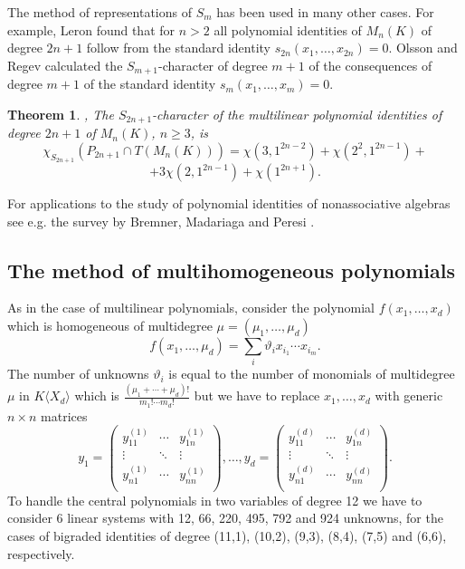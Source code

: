 \documentclass[12pt]{amsart}
\newtheorem{theorem}{Theorem}[section]
\theoremstyle{definition}
\begin{document}
The method of representations of $S_m$ has been used in many other cases.
For example, Leron \cite{Ler} found that for $n>2$ all polynomial identities of $M_n(K)$ of degree $2n+1$
follow from the standard identity $s_{2n}(x_1,\ldots,x_{2n})=0$.
Olsson and Regev \cite{OlsReg} calculated the $S_{m+1}$-character of degree $m+1$
of the consequences of degree $m+1$ of the standard identity $s_m(x_1,\ldots,x_m)=0$.

\begin{theorem}\cite[Theorem 20]{Ler}, \cite[Theorem 1]{OlsReg}\label{Olsson and Regev}
The $S_{2n+1}$-character of the
multilinear polynomial identities of degree $2n+1$ of $M_n(K)$, $n\geq 3$, is
\[
\chi_{S_{2n+1}}(P_{2n+1}\cap T(M_n(K)))=\chi(3,1^{2n-2})+\chi(2^2,1^{2n-1})+
\]
\[
+3\chi(2,1^{2n-1})+\chi(1^{2n+1}).
\]
\end{theorem}

For applications to the study of polynomial identities of nonassociative algebras see e.g.
the survey by Bremner, Madariaga and Peresi \cite{BreMaPe}.

\subsection{The method of multihomogeneous polynomials}
As in the case of multilinear polynomials, consider the polynomial $f(x_1,\ldots,x_d)$ which is homogeneous of multidegree $\mu=(\mu_1,\ldots,\mu_d)$
\[
f(x_1,\ldots,\mu_d)=\sum_i\vartheta_ix_{i_1}\cdots x_{i_m}.
\]
The number of unknowns $\vartheta_i$ is equal to the number of monomials of multidegree $\mu$ in $K\langle X_d\rangle$ which is
$\displaystyle \frac{(\mu_1+\cdots+\mu_d)!}{m_1!\cdots m_d!}$ but we have to replace $x_1,\ldots,x_d$ with generic $n\times n$ matrices
\[
y_1=\left(\begin{matrix}y^{(1)}_{11}&\cdots&y^{(1)}_{1n}\\
\vdots&\ddots&\vdots\\
y^{(1)}_{n1}&\cdots&y^{(1)}_{nn}\\
\end{matrix}\right),\ldots,
y_d=\left(\begin{matrix}y^{(d)}_{11}&\cdots&y^{(d)}_{1n}\\
\vdots&\ddots&\vdots\\
y^{(d)}_{n1}&\cdots&y^{(d)}_{nn}\\
\end{matrix}\right).
\]
To handle the central polynomials in two variables of degree 12 we have to consider 6 linear systems
with 12, 66, 220, 495, 792 and 924 unknowns, for the cases of bigraded identities of degree
(11,1), (10,2), (9,3), (8,4), (7,5) and (6,6), respectively.
\end{document}
